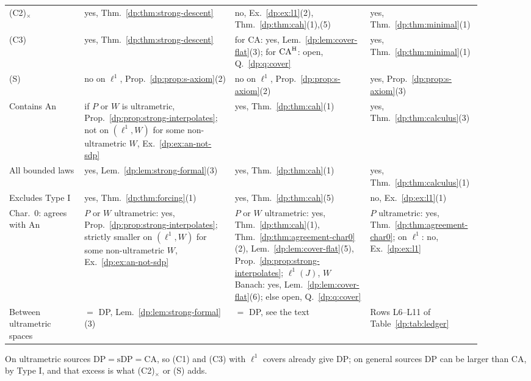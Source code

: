 \begin{table}[htbp]
\begin{tabular}{@{}p{0.15\linewidth}p{0.3\linewidth}p{0.27\linewidth}p{0.18\linewidth}@{}}
(C2)$_\times$ & yes, Thm.~\ref{dp:thm:strong-descent} & no, Ex.~\ref{dp:ex:l1}(2), Thm.~\ref{dp:thm:cah}(1),(5) & yes, Thm.~\ref{dp:thm:minimal}(1)\\
(C3) & yes, Thm.~\ref{dp:thm:strong-descent} & for CA: yes, Lem.~\ref{dp:lem:cover-flat}(3); for $\mathrm{CA}^{\rm H}$: open, Q.~\ref{dp:q:cover} & yes, Thm.~\ref{dp:thm:minimal}(1)\\
(S) & no on $\ell^1$, Prop.~\ref{dp:prop:s-axiom}(2) & no on $\ell^1$, Prop.~\ref{dp:prop:s-axiom}(2) & yes, Prop.~\ref{dp:prop:s-axiom}(3)\\
Contains An & if $P$ or $W$ is ultrametric, Prop.~\ref{dp:prop:strong-interpolates}; not on $(\ell^1,W)$ for some non-ultrametric $W$, Ex.~\ref{dp:ex:an-not-sdp} & yes, Thm.~\ref{dp:thm:cah}(1) & yes, Thm.~\ref{dp:thm:calculus}(3)\\
All bounded laws & yes, Lem.~\ref{dp:lem:strong-formal}(3) & yes, Thm.~\ref{dp:thm:cah}(1) & yes, Thm.~\ref{dp:thm:calculus}(1)\\
Excludes Type I & yes, Thm.~\ref{dp:thm:forcing}(1) & yes, Thm.~\ref{dp:thm:cah}(5) & no, Ex.~\ref{dp:ex:l1}(1)\\
Char.\ $0$: agrees with An & $P$ or $W$ ultrametric: yes, Prop.~\ref{dp:prop:strong-interpolates}; strictly smaller on $(\ell^1,W)$ for some non-ultrametric $W$, Ex.~\ref{dp:ex:an-not-sdp} & $P$ or $W$ ultrametric: yes, Thm.~\ref{dp:thm:cah}(1), Thm.~\ref{dp:thm:agreement-char0}(2), Lem.~\ref{dp:lem:cover-flat}(5), Prop.~\ref{dp:prop:strong-interpolates}; $\ell^1(J)$, $W$ Banach: yes, Lem.~\ref{dp:lem:cover-flat}(6); else open, Q.~\ref{dp:q:cover} & $P$ ultrametric: yes, Thm.~\ref{dp:thm:agreement-char0}; on $\ell^1$: no, Ex.~\ref{dp:ex:l1}\\
Between ultrametric spaces & $=$ DP, Lem.~\ref{dp:lem:strong-formal}(3) & $=$ DP, see the text & Rows L6--L11 of Table~\ref{dp:tab:ledger}\\
\end{tabular}
\end{table}

On ultrametric sources $\mathrm{DP}=\mathrm{sDP}=\mathrm{CA}$, so (C1) and (C3) with $\ell^1$ covers already give DP; on general sources DP can be larger than CA, by Type I, and that excess is what (C2)$_\times$ or (S) adds.
